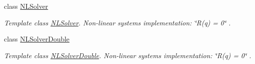 \begin{DoxyCompactItemize}
class \hyperlink{classlmx_1_1NLSolver}{N\-L\-Solver}
\begin{DoxyCompactList}\small\item\em Template class \hyperlink{classlmx_1_1NLSolver}{N\-L\-Solver}. Non-\/linear systems implementation\-: \char`\"{}\-R(q) = 0\char`\"{} . \end{DoxyCompactList}\item 
class \hyperlink{classlmx_1_1NLSolverDouble}{N\-L\-Solver\-Double}
\begin{DoxyCompactList}\small\item\em Template class \hyperlink{classlmx_1_1NLSolverDouble}{N\-L\-Solver\-Double}. Non-\/linear systems implementation\-: \char`\"{}\-R(q) = 0\char`\"{} . \end{DoxyCompactList}\end{DoxyCompactItemize}
